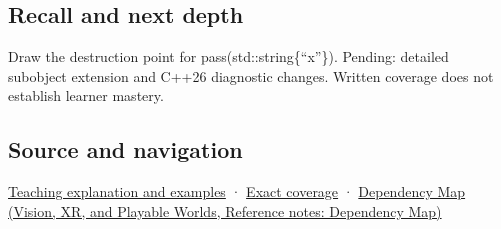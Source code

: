 \subsection{Recall and next depth}\label{appendix-a978b29bbbb0-recall-and-next-depth}

Draw the destruction point for pass(std::string\{``x''\}). Pending: detailed subobject extension and C++26 diagnostic changes. Written coverage does not establish learner mastery.

\subsection{Source and navigation}\label{appendix-a978b29bbbb0-source-and-navigation}

\hyperref[01-foundations-i-ch003-a-temporary-needs-an-explicit-lifetime-story]{Teaching explanation and examples} · \hyperref[appendix-fd090d982a15-m008---parts-113-126]{Exact coverage} · \href{../07-Vision-XR-and-Playable-Worlds/main.pdf\#nameddest=appendix-4ad47bdd269a}{Dependency Map (Vision, XR, and Playable Worlds, Reference notes: Dependency Map)}
